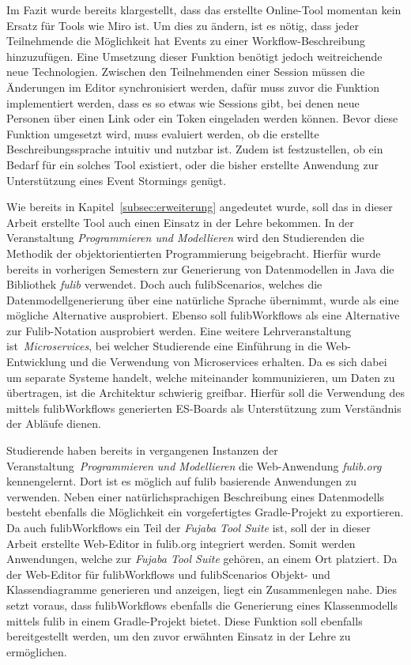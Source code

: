 Im Fazit wurde bereits klargestellt, dass das erstellte Online-Tool momentan kein Ersatz für Tools wie Miro ist.
Um dies zu ändern, ist es nötig, dass jeder Teilnehmende die Möglichkeit hat Events zu einer Workflow-Beschreibung hinzuzufügen.
Eine Umsetzung dieser Funktion benötigt jedoch weitreichende neue Technologien.
Zwischen den Teilnehmenden einer Session müssen die Änderungen im Editor synchronisiert werden, dafür muss zuvor die Funktion
implementiert werden, dass es so etwas wie Sessions gibt, bei denen neue Personen über einen Link oder ein Token eingeladen werden können.
Bevor diese Funktion umgesetzt wird, muss evaluiert werden, ob die erstellte Beschreibungssprache intuitiv und nutzbar ist.
Zudem ist festzustellen, ob ein Bedarf für ein solches Tool existiert, oder die bisher erstellte Anwendung zur Unterstützung eines Event Stormings genügt.

Wie bereits in Kapitel~\ref{subsec:erweiterung} angedeutet wurde, soll das in dieser Arbeit erstellte Tool auch einen Einsatz in der Lehre bekommen.
In der Veranstaltung \textit{Programmieren und Modellieren} wird den Studierenden die Methodik der objektorientierten Programmierung beigebracht.
Hierfür wurde bereits in vorherigen Semestern zur Generierung von Datenmodellen in Java die Bibliothek \textit{fulib} verwendet.
Doch auch fulibScenarios, welches die Datenmodellgenerierung über eine natürliche Sprache übernimmt, wurde als eine mögliche Alternative ausprobiert.
Ebenso soll fulibWorkflows als eine Alternative zur Fulib-Notation ausprobiert werden.
Eine weitere Lehrveranstaltung ist~\textit{Microservices}, bei welcher Studierende eine Einführung in die Web-Entwicklung und die Verwendung von
Microservices erhalten.
Da es sich dabei um separate Systeme handelt, welche miteinander kommunizieren, um Daten zu übertragen, ist die Architektur schwierig greifbar.
Hierfür soll die Verwendung des mittels fulibWorkflows generierten \ac{ES}-Boards als Unterstützung zum Verständnis der Abläufe dienen.

Studierende haben bereits in vergangenen Instanzen der Veranstaltung~\textit{Programmieren und Modellieren} die Web-Anwendung \textit{fulib.org} kennengelernt.
Dort ist es möglich auf fulib basierende Anwendungen zu verwenden.
Neben einer natürlichsprachigen Beschreibung eines Datenmodells besteht ebenfalls die Möglichkeit ein vorgefertigtes Gradle-Projekt zu exportieren.
Da auch fulibWorkflows ein Teil der \textit{Fujaba Tool Suite} ist, soll der in dieser Arbeit erstellte Web-Editor in fulib.org integriert werden.
Somit werden Anwendungen, welche zur \textit{Fujaba Tool Suite} gehören, an einem Ort platziert.
Da der Web-Editor für fulibWorkflows und fulibScenarios Objekt- und Klassendiagramme generieren und anzeigen, liegt ein Zusammenlegen nahe.
Dies setzt voraus, dass fulibWorkflows ebenfalls die Generierung eines Klassenmodells mittels fulib in einem Gradle-Projekt bietet.
Diese Funktion soll ebenfalls bereitgestellt werden, um den zuvor erwähnten Einsatz in der Lehre zu ermöglichen.
